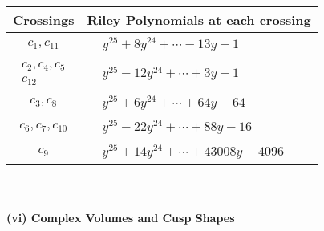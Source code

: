 \documentclass[1p]{elsarticle_modified}
\theoremstyle{definition}
\begin{document}
\begin{tabular}{m{50pt}|m{274pt}}
Crossings & \hspace{64pt}Riley Polynomials at each crossing \\
\hline $$\begin{aligned}c_{1},c_{11}\end{aligned}$$&$\begin{aligned}
&y^{25}+8 y^{24}+\cdots-13 y-1
\end{aligned}$\\
\hline $$\begin{aligned}c_{2},c_{4},c_{5}\\c_{12}\end{aligned}$$&$\begin{aligned}
&y^{25}-12 y^{24}+\cdots+3 y-1
\end{aligned}$\\
\hline $$\begin{aligned}c_{3},c_{8}\end{aligned}$$&$\begin{aligned}
&y^{25}+6 y^{24}+\cdots+64 y-64
\end{aligned}$\\
\hline $$\begin{aligned}c_{6},c_{7},c_{10}\end{aligned}$$&$\begin{aligned}
&y^{25}-22 y^{24}+\cdots+88 y-16
\end{aligned}$\\
\hline $$\begin{aligned}c_{9}\end{aligned}$$&$\begin{aligned}
&y^{25}+14 y^{24}+\cdots+43008 y-4096
\end{aligned}$\\
\hline
\end{tabular}\\~\\
\newpage\flushleft \textbf{(vi) Complex Volumes and Cusp Shapes}
\end{document}
